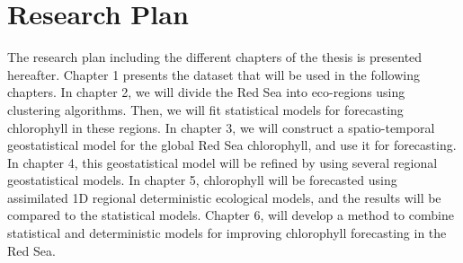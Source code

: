 \chapter{Research Plan}

The research plan including the different chapters of the thesis is presented
hereafter.  Chapter 1 presents the dataset that will be used in the following
chapters.  In chapter 2, we will divide the Red Sea into eco-regions using
clustering algorithms. Then, we will fit statistical models for forecasting
chlorophyll in these regions. In chapter 3, we will construct a spatio-temporal
geostatistical model for the global Red Sea chlorophyll, and use it for
forecasting. In chapter 4, this geostatistical model will be refined by using
several regional geostatistical models. In chapter 5, chlorophyll will be
forecasted using assimilated 1D regional deterministic ecological models, and
the results will be compared to the statistical models.  Chapter 6, will
develop a method to combine statistical and deterministic models for improving
chlorophyll forecasting in the Red Sea.
